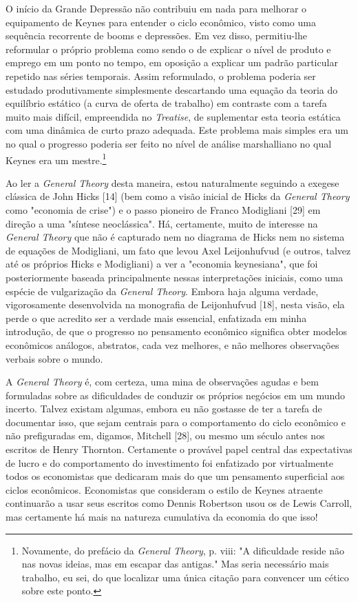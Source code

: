 \documentclass[12pt]{article}
\begin{document}
O início da Grande Depressão não contribuiu em nada para melhorar o equipamento de Keynes para entender o ciclo econômico, visto como uma sequência recorrente de booms e depressões. Em vez disso, permitiu-lhe reformular o próprio problema como sendo o de explicar o nível de produto e emprego em um ponto no tempo, em oposição a explicar um padrão particular repetido nas séries temporais. Assim reformulado, o problema poderia ser estudado produtivamente simplesmente descartando uma equação da teoria do equilíbrio estático (a curva de oferta de trabalho) em contraste com a tarefa muito mais difícil, empreendida no \textit{Treatise}, de suplementar esta teoria estática com uma dinâmica de curto prazo adequada. Este problema mais simples era um no qual o progresso poderia ser feito no nível de análise marshalliano no qual Keynes era um mestre.\footnote{Novamente, do prefácio da \textit{General Theory}, p. viii: "A dificuldade reside não nas novas ideias, mas em escapar das antigas." Mas seria necessário mais trabalho, eu sei, do que localizar uma única citação para convencer um cético sobre este ponto.}

Ao ler a \textit{General Theory} desta maneira, estou naturalmente seguindo a exegese clássica de John Hicks [14] (bem como a visão inicial de Hicks da \textit{General Theory} como "economia de crise") e o passo pioneiro de Franco Modigliani [29] em direção a uma "síntese neoclássica". Há, certamente, muito de interesse na \textit{General Theory} que não é capturado nem no diagrama de Hicks nem no sistema de equações de Modigliani, um fato que levou Axel Leijonhufvud (e outros, talvez até os próprios Hicks e Modigliani) a ver a "economia keynesiana", que foi posteriormente baseada principalmente nessas interpretações iniciais, como uma espécie de vulgarização da \textit{General Theory}. Embora haja alguma verdade, vigorosamente desenvolvida na monografia de Leijonhufvud [18], nesta visão, ela perde o que acredito ser a verdade mais essencial, enfatizada em minha introdução, de que o progresso no pensamento econômico significa obter modelos econômicos análogos, abstratos, cada vez melhores, e não melhores observações verbais sobre o mundo.

A \textit{General Theory} é, com certeza, uma mina de observações agudas e bem formuladas sobre as dificuldades de conduzir os próprios negócios em um mundo incerto. Talvez existam algumas, embora eu não gostasse de ter a tarefa de documentar isso, que sejam centrais para o comportamento do ciclo econômico e não prefiguradas em, digamos, Mitchell [28], ou mesmo um século antes nos escritos de Henry Thornton. Certamente o provável papel central das expectativas de lucro e do comportamento do investimento foi enfatizado por virtualmente todos os economistas que dedicaram mais do que um pensamento superficial aos ciclos econômicos. Economistas que consideram o estilo de Keynes atraente continuarão a usar seus escritos como Dennis Robertson usou os de Lewis Carroll, mas certamente há mais na natureza cumulativa da economia do que isso!
\end{document}
